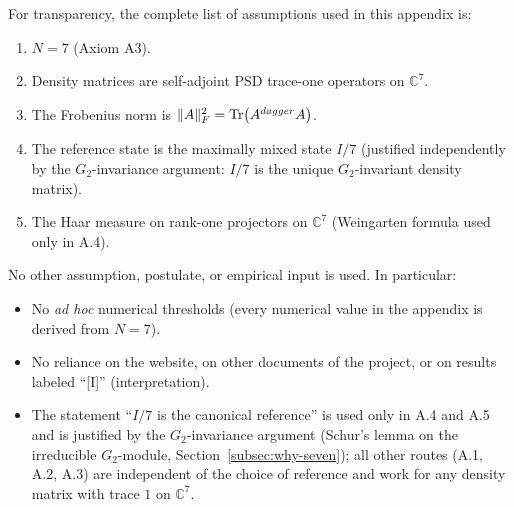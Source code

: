 For transparency, the complete list of assumptions used in this appendix is:

\begin{enumerate}[leftmargin=2em,nosep]
  \item $N = 7$ (Axiom A3).
  \item Density matrices are self-adjoint PSD trace-one operators on $\mathbb{C}^7$.
  \item The Frobenius norm is $\|A\|_F^2 = \Tr(A^{dagger}A)$.
  \item The reference state is the maximally mixed state $I/7$
    (justified independently by the $G_2$-invariance argument: $I/7$ is the unique
    $G_2$-invariant density matrix).
  \item The Haar measure on rank-one projectors on $\mathbb{C}^7$ (Weingarten formula used only in A.4).
\end{enumerate}

No other assumption, postulate, or empirical input is used. In particular:
\begin{itemize}[leftmargin=2em,nosep]
  \item No \emph{ad hoc} numerical thresholds (every numerical value in the
    appendix is derived from $N=7$).
  \item No reliance on the website, on other documents of the project, or
    on results labeled ``[I]'' (interpretation).
  \item The statement ``$I/7$ is the canonical reference'' is used only in
    A.4 and A.5 and is justified by the $G_2$-invariance argument
    (Schur's lemma on the irreducible $G_2$-module, Section~\ref{subsec:why-seven}); all other routes (A.1, A.2, A.3)
    are independent of the choice of reference and work for any density
    matrix with trace $1$ on $\mathbb{C}^7$.
\end{itemize}
